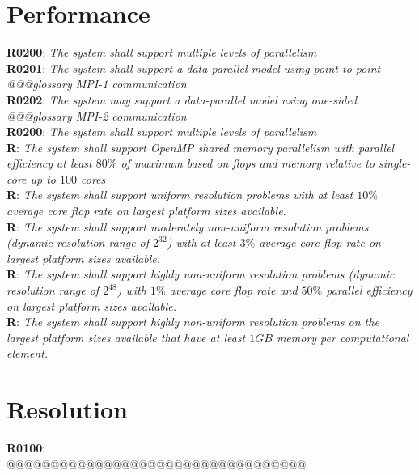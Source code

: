 \documentclass{book}
\newcommand{\req}[2]{\textbf{R#1}: \textit{#2} \\}
\begin{document}
\section{Performance}
\req{0200}{The system shall support multiple levels of parallelism}
\req{0201}{The system shall support a data-parallel model using point-to-point @@@glossary MPI-1 communication}
\req{0202}{The system may support a data-parallel model using one-sided @@@glossary MPI-2 communication} 
\req{0200}{The system shall support multiple levels of parallelism}
\req{}{The system shall support OpenMP shared memory parallelism with parallel efficiency at least $80\%$ of maximum based on flops and memory relative to single-core up to $100$ cores}
\req{}{The system shall support uniform resolution problems with at least $10\%$ average core flop rate on largest platform sizes available.}
\req{}{The system shall support moderately non-uniform resolution problems (dynamic resolution range of $2^32$) with at least $3\%$ average core flop rate on largest platform sizes available.}
\req{}{The system shall support highly non-uniform resolution problems (dynamic resolution range of $2^48$) with $1\%$ average core flop rate and $50\%$ parallel efficiency on largest platform sizes available.}
\req{}{The system shall support highly non-uniform resolution problems on the largest platform sizes available that have at least $1GB$ memory per computational element.}

\section{Resolution}
\req{0100}{}

@@@@@@@@@@@@@@@@@@@@@@@@@@@@@@@@@@

\appendix
\end{document}
